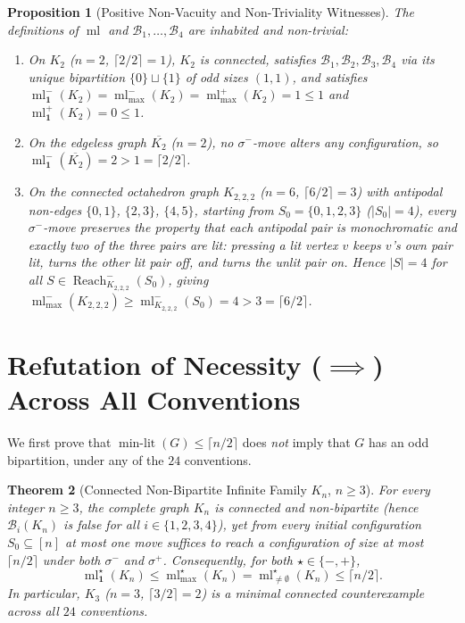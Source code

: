 \documentclass[11pt,a4paper]{article}
\newtheorem{theorem}{Theorem}[section]
\newtheorem{proposition}[theorem]{Proposition}
\theoremstyle{definition}
\newcommand{\ml}{\operatorname{ml}}
\newcommand{\Reach}{\operatorname{Reach}}
\newcommand{\ceilhalf}[1]{\lceil #1 / 2 \rceil}
\begin{document}
\begin{proposition}[Positive Non-Vacuity and Non-Triviality Witnesses]
\label{prop:witnesses}
The definitions of $\ml$ and $\mathcal{B}_1, \dots, \mathcal{B}_4$ are inhabited and
non-trivial:
\begin{enumerate}
\item[(a)] On $K_2$ ($n = 2$, $\ceilhalf{2} = 1$), $K_2$ is connected, satisfies
$\mathcal{B}_1, \mathcal{B}_2, \mathcal{B}_3, \mathcal{B}_4$ via its unique bipartition
$\{0\} \sqcup \{1\}$ of odd sizes $(1, 1)$, and satisfies
$\ml_{\mathbf{1}}^-(K_2) = \ml_{\max}^-(K_2) = \ml_{\max}^+(K_2) = 1 \le 1$ and
$\ml_{\mathbf{1}}^+(K_2) = 0 \le 1$.
\item[(b)] On the edgeless graph $\overline{K_2}$ ($n = 2$), no $\sigma^-$-move alters
any configuration, so $\ml_{\mathbf{1}}^-(\overline{K_2}) = 2 > 1 = \ceilhalf{2}$.
\item[(c)] On the connected octahedron graph $K_{2,2,2}$ ($n = 6$, $\ceilhalf{6} = 3$)
with antipodal non-edges $\{0,1\}$, $\{2,3\}$, $\{4,5\}$, starting from
$S_0 = \{0, 1, 2, 3\}$ ($|S_0| = 4$), every $\sigma^-$-move preserves the property
that each antipodal pair is monochromatic and exactly two of the three pairs are lit:
pressing a lit vertex $v$ keeps $v$'s own pair lit, turns the other lit pair off,
and turns the unlit pair on. Hence $|S| = 4$ for all $S \in \Reach_{K_{2,2,2}}^-(S_0)$,
giving $\ml_{\max}^-(K_{2,2,2}) \ge \ml_{K_{2,2,2}}^-(S_0) = 4 > 3 = \ceilhalf{6}$.
\end{enumerate}
\end{proposition}

\section{Refutation of Necessity (\texorpdfstring{$\implies$}{=>}) Across All Conventions}

We first prove that $\operatorname{min-lit}(G) \le \ceilhalf{n}$ does \emph{not}
imply that $G$ has an odd bipartition, under any of the $24$ conventions.

\begin{theorem}[Connected Non-Bipartite Infinite Family $K_n$, $n \ge 3$]
\label{thm:kn}
For every integer $n \ge 3$, the complete graph $K_n$ is connected and non-bipartite
(hence $\mathcal{B}_i(K_n)$ is false for all $i \in \{1, 2, 3, 4\}$), yet from
\emph{every} initial configuration $S_0 \subseteq [n]$ at most one move suffices to
reach a configuration of size at most $\ceilhalf{n}$ under both $\sigma^-$ and
$\sigma^+$. Consequently, for both $\star \in \{-, +\}$,
\[
\ml_{\mathbf{1}}^\star(K_n) \le \ml_{\max}^\star(K_n) = \ml_{\neq\emptyset}^\star(K_n) \le \ceilhalf{n}.
\]
In particular, $K_3$ ($n = 3$, $\ceilhalf{3} = 2$) is a minimal connected counterexample
across all $24$ conventions.
\end{theorem}
\end{document}
